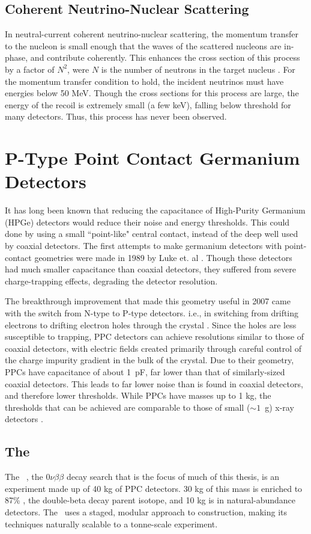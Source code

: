 \subsection{Coherent Neutrino-Nuclear Scattering}
In neutral-current coherent neutrino-nuclear scattering, the momentum transfer to the nucleon is small enough that the waves of the scattered nucleons are in-phase, and contribute coherently. This enhances the cross section of this process by a factor of $N^2$, were $N$ is the number of neutrons in the target nucleus \cite{Drukier1984}. For the momentum transfer condition to hold, the incident neutrinos must have energies below 50 MeV. Though the cross sections for this process are large, the energy of the recoil is extremely small (a few keV), falling below threshold for many detectors. Thus, this process has never been observed. 

\section{P-Type Point Contact Germanium Detectors}
It has long been known that reducing the capacitance of High-Purity Germanium (HPGe) detectors would reduce their noise and energy thresholds. This could done by using a small ``point-like" central contact, instead of the deep well used by coaxial detectors. The first attempts to make germanium detectors with point-contact geometries were made in 1989 by Luke et. al \cite{Luke1989}. Though these detectors had much smaller capacitance than coaxial detectors, they suffered from severe charge-trapping effects, degrading the detector resolution. 

The breakthrough improvement that made this geometry useful in 2007 came with the switch from N-type to P-type detectors. i.e., in switching from drifting electrons to drifting electron holes through the crystal \cite{Barbeau2007}. Since the holes are less susceptible to trapping, PPC detectors can achieve resolutions similar to those of coaxial detectors, with electric fields created primarily through careful control of the charge impurity gradient in the bulk of the crystal. Due to their geometry, PPCs have capacitance of about 1~pF, far lower than that of similarly-sized coaxial detectors. This leads to far lower noise than is found in coaxial detectors, and therefore lower thresholds. While PPCs have masses up to 1 kg, the thresholds that can be achieved are comparable to those of small ($\sim1$~g) x-ray detectors \cite{Barbeau2007}. 

\subsection{The \MJ~\MJDemo}
The \MJ~\MJDemo, the $0\nu\beta\beta$ decay search that is the focus of much of this thesis, is an experiment made up of 40 kg of PPC detectors. 30 kg of this mass is enriched to 87\% , the double-beta decay parent isotope, and 10 kg is in natural-abundance detectors. The \MJDemo~uses a staged, modular approach to construction, making its techniques naturally scalable to a tonne-scale experiment. 

